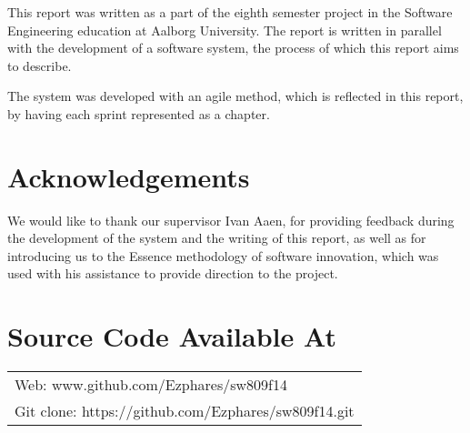 This report was written as a part of the eighth semester project in the Software Engineering education at Aalborg University. The report is written in parallel with the development of a software system, the process of which this report aims to describe.

The system was developed with an agile method, which is reflected in this report, by having each sprint represented as a chapter.

\section*{Acknowledgements}

We would like to thank our supervisor Ivan Aaen, for providing feedback during the development of the system and the writing of this report, as well as for introducing us to the Essence methodology of software innovation, which was used with his assistance to provide direction to the project.

\section*{Source Code Available At}
\begin{tabular}{l}
Web: www.github.com/Ezphares/sw809f14 \\
Git clone: https://github.com/Ezphares/sw809f14.git
\end{tabular}
